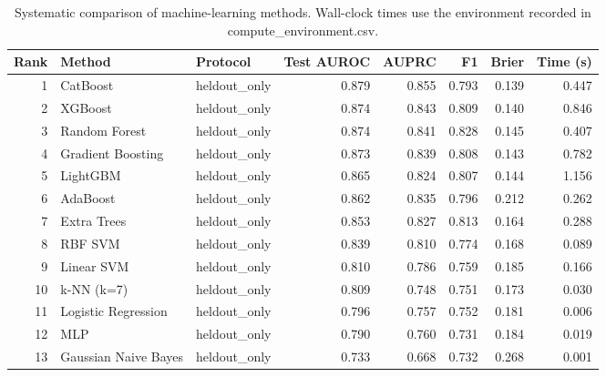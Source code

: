 \begin{table}[htbp]
\centering
\caption{Systematic comparison of machine-learning methods. Wall-clock times use the environment recorded in compute_environment.csv.}
\label{tab:method_comparison_recomputed}
\begin{tabular}{rllrrrrr}
\toprule
Rank & Method & Protocol & Test AUROC & AUPRC & F1 & Brier & Time (s) \\
\midrule
1 & CatBoost & heldout\_only & 0.879 & 0.855 & 0.793 & 0.139 & 0.447 \\
2 & XGBoost & heldout\_only & 0.874 & 0.843 & 0.809 & 0.140 & 0.846 \\
3 & Random Forest & heldout\_only & 0.874 & 0.841 & 0.828 & 0.145 & 0.407 \\
4 & Gradient Boosting & heldout\_only & 0.873 & 0.839 & 0.808 & 0.143 & 0.782 \\
5 & LightGBM & heldout\_only & 0.865 & 0.824 & 0.807 & 0.144 & 1.156 \\
6 & AdaBoost & heldout\_only & 0.862 & 0.835 & 0.796 & 0.212 & 0.262 \\
7 & Extra Trees & heldout\_only & 0.853 & 0.827 & 0.813 & 0.164 & 0.288 \\
8 & RBF SVM & heldout\_only & 0.839 & 0.810 & 0.774 & 0.168 & 0.089 \\
9 & Linear SVM & heldout\_only & 0.810 & 0.786 & 0.759 & 0.185 & 0.166 \\
10 & k-NN (k=7) & heldout\_only & 0.809 & 0.748 & 0.751 & 0.173 & 0.030 \\
11 & Logistic Regression & heldout\_only & 0.796 & 0.757 & 0.752 & 0.181 & 0.006 \\
12 & MLP & heldout\_only & 0.790 & 0.760 & 0.731 & 0.184 & 0.019 \\
13 & Gaussian Naive Bayes & heldout\_only & 0.733 & 0.668 & 0.732 & 0.268 & 0.001 \\
\bottomrule
\end{tabular}

\end{table}
